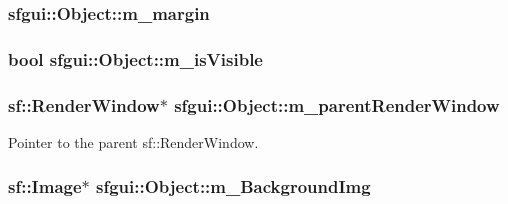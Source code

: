 \hypertarget{classsfgui_1_1Object_b7afeee103f0cfc0c045effa8527a4b4}{
\subsubsection[m\_\-margin]{ {\bf sfgui::Object::m\_\-margin}}}
\label{classsfgui_1_1Object_b7afeee103f0cfc0c045effa8527a4b4}


\hypertarget{classsfgui_1_1Object_105c5d17fb896da439156e5c198e5bb2}{
\subsubsection[m\_\-isVisible]{\setlength{\rightskip}{0pt plus 5cm}bool {\bf sfgui::Object::m\_\-isVisible}}}
\label{classsfgui_1_1Object_105c5d17fb896da439156e5c198e5bb2}


\hypertarget{classsfgui_1_1Object_518ad23f1c9aab6fd9b346d708c503a8}{
\subsubsection[m\_\-parentRenderWindow]{\setlength{\rightskip}{0pt plus 5cm}sf::RenderWindow$\ast$ {\bf sfgui::Object::m\_\-parentRenderWindow}}}
\label{classsfgui_1_1Object_518ad23f1c9aab6fd9b346d708c503a8}


Pointer to the parent sf::RenderWindow. 

\hypertarget{classsfgui_1_1Object_08225eee55352c02435d14e1bce24dbe}{
\subsubsection[m\_\-BackgroundImg]{\setlength{\rightskip}{0pt plus 5cm}sf::Image$\ast$ {\bf sfgui::Object::m\_\-BackgroundImg}}}
\label{classsfgui_1_1Object_08225eee55352c02435d14e1bce24dbe}


